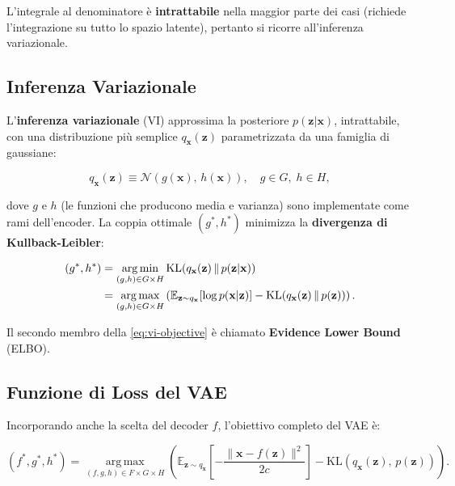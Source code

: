 L'integrale al denominatore è \textbf{intrattabile} nella maggior parte
dei casi (richiede l'integrazione su tutto lo spazio latente), pertanto
si ricorre all'inferenza variazionale.

\subsection{Inferenza Variazionale}
\label{subsec:variational-inference}

L'\textbf{inferenza variazionale} (VI) approssima la posteriore
$p(\mathbf{z}|\mathbf{x})$, intrattabile, con una distribuzione più semplice
$q_\mathbf{x}(\mathbf{z})$ parametrizzata da una famiglia di gaussiane:

\begin{equation}
  q_\mathbf{x}(\mathbf{z}) \equiv \mathcal{N}(g(\mathbf{x}),\, h(\mathbf{x})),
  \quad g \in G,\; h \in H,
  \label{eq:vi-approx}
\end{equation}

dove $g$ e $h$ (le funzioni che producono media e varianza) sono
implementate come rami dell'encoder. La coppia ottimale $(g^*, h^*)$
minimizza la \textbf{divergenza di Kullback-Leibler}:

\begin{align}
  (g^*, h^*) &= \operatorname*{arg\,min}_{(g,h) \in G \times H}
    \mathrm{KL}\!\left(q_\mathbf{x}(\mathbf{z})\,\|\,p(\mathbf{z}|\mathbf{x})\right)
  \notag \\
  &= \operatorname*{arg\,max}_{(g,h) \in G \times H}
    \left(\mathbb{E}_{\mathbf{z} \sim q_\mathbf{x}}
      \!\left[\log p(\mathbf{x}|\mathbf{z})\right]
    - \mathrm{KL}\!\left(q_\mathbf{x}(\mathbf{z})\,\|\,p(\mathbf{z})\right)
    \right).
  \label{eq:vi-objective}
\end{align}

Il secondo membro della \eqref{eq:vi-objective} è chiamato
\textbf{Evidence Lower Bound} (ELBO).

\subsection{Funzione di Loss del VAE}
\label{subsec:vae-loss}

Incorporando anche la scelta del decoder $f$, l'obiettivo completo del
VAE è:

\begin{equation}
  (f^*, g^*, h^*) = \operatorname*{arg\,max}_{(f,g,h) \in F \times G \times H}
    \left(\mathbb{E}_{\mathbf{z} \sim q_\mathbf{x}}\!\left[
      -\frac{\|\mathbf{x} - f(\mathbf{z})\|^2}{2c}
    \right]
    - \mathrm{KL}\!\left(q_\mathbf{x}(\mathbf{z}),\, p(\mathbf{z})\right)
    \right).
  \label{eq:vae-full-objective}
\end{equation}

